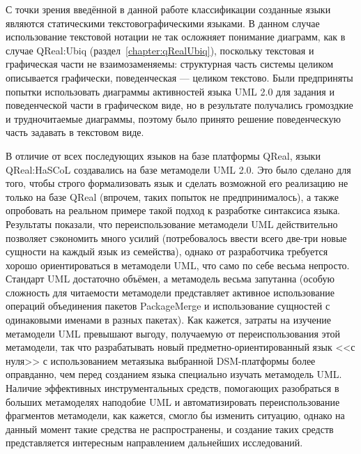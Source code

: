 С точки зрения введённой в данной работе классификации созданные языки являются статическими 
текстовографическими языками. В данном случае использование текстовой нотации не так 
осложняет понимание диаграмм, как в случае QReal:Ubiq (раздел~\ref{chapter:qRealUbiq}), 
поскольку текстовая и графическая части не взаимозаменяемы: структурная часть системы 
целиком описывается графически, поведенческая --- целиком текстово. Были предприняты 
попытки использовать диаграммы активностей языка UML 2.0 для задания и поведенческой 
части в графическом виде, но в результате получались громоздкие и трудночитаемые диаграммы, 
поэтому было принято решение поведенческую часть задавать в текстовом виде.

В отличие от всех последующих языков на базе платформы QReal, языки QReal:HaSCoL создавались 
на базе метамодели UML 2.0. Это было сделано для того, чтобы строго формализовать 
язык и сделать возможной его реализацию не только на базе QReal (впрочем, таких попыток 
не предпринималось), а также опробовать на реальном примере такой подход к разработке 
синтаксиса языка. Результаты показали, что переиспользование метамодели UML действительно 
позволяет сэкономить много усилий (потребовалось ввести всего две-три новые сущности 
на каждый язык из семейства), однако от разработчика требуется хорошо ориентироваться
в метамодели UML, что само по себе весьма непросто. Стандарт UML достаточно объёмен, 
а метамодель весьма запутанна (особую сложность для читаемости метамодели представляет 
активное использование операций объединения пакетов PackageMerge и использование сущностей 
с одинаковыми именами в разных пакетах). Как кажется, затраты на изучение метамодели 
UML превышают выгоду, получаемую от переиспользования этой метамодели, так что разрабатывать 
новый предметно-ориентированный язык <<с нуля>> с использованием метаязыка выбранной 
\ac{DSM}-платформы более оправданно, чем перед созданием языка специально изучать метамодель 
UML. Наличие эффективных инструментальных средств, помогающих разобраться в больших 
метамоделях наподобие UML и автоматизировать переиспользование фрагментов метамодели, 
как кажется, смогло бы изменить ситуацию, однако на данный момент такие средства не 
распространены, и создание таких средств представляется интересным направлением дальнейших 
исследований.
